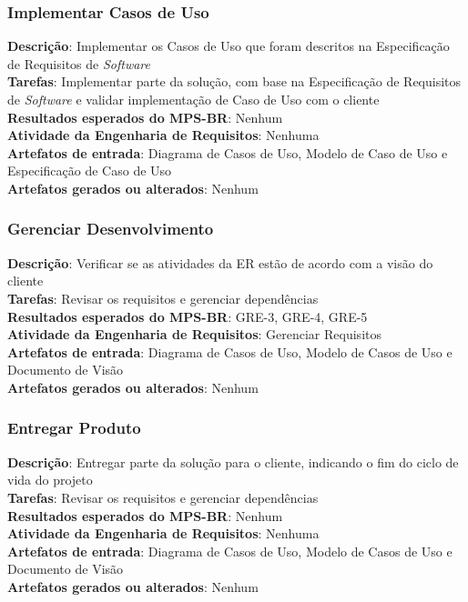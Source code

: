 \subsubsection{Implementar Casos de Uso}

\textbf{Descrição}: Implementar os Casos de Uso que foram descritos na Especificação de Requisitos de \textit{Software}\\
\textbf{Tarefas}: Implementar parte da solução, com base na Especificação de Requisitos de \textit{Software} e validar implementação de Caso de Uso com o cliente\\
\textbf{Resultados esperados do MPS-BR}: Nenhum\\
\textbf{Atividade da Engenharia de Requisitos}: Nenhuma\\
\textbf{Artefatos de entrada}: Diagrama de Casos de Uso, Modelo de Caso de Uso e Especificação de Caso de Uso\\
\textbf{Artefatos gerados ou alterados}: Nenhum

\subsubsection{Gerenciar Desenvolvimento}

\textbf{Descrição}: Verificar se as atividades da ER estão de acordo com a visão do cliente\\
\textbf{Tarefas}: Revisar os requisitos e gerenciar dependências\\
\textbf{Resultados esperados do MPS-BR}: GRE-3, GRE-4, GRE-5\\
\textbf{Atividade da Engenharia de Requisitos}: Gerenciar Requisitos\\
\textbf{Artefatos de entrada}: Diagrama de Casos de Uso, Modelo de Casos de Uso e Documento de Visão\\
\textbf{Artefatos gerados ou alterados}: Nenhum

\subsubsection{Entregar Produto}

\textbf{Descrição}: Entregar parte da solução para o cliente, indicando o fim do ciclo de vida do projeto\\
\textbf{Tarefas}: Revisar os requisitos e gerenciar dependências\\
\textbf{Resultados esperados do MPS-BR}: Nenhum\\
\textbf{Atividade da Engenharia de Requisitos}: Nenhuma\\
\textbf{Artefatos de entrada}: Diagrama de Casos de Uso, Modelo de Casos de Uso e Documento de Visão\\
\textbf{Artefatos gerados ou alterados}: Nenhum

